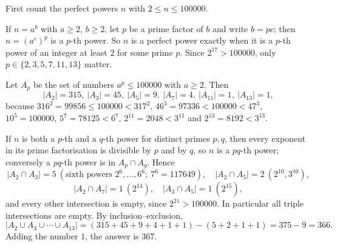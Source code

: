 First count the perfect powers $n$ with $2\le n\le100000$.

If $n=a^b$ with $a\ge2$, $b\ge2$, let $p$ be a prime factor of $b$ and write $b=pc$; then $n=\left(a^{c}\right)^p$ is a $p$-th power. So $n$ is a perfect power exactly when it is a $p$-th power of an integer at least $2$ for some prime $p$. Since $2^{17}>100000$, only $p\in\{2,3,5,7,11,13\}$ matter.

Let $A_p$ be the set of numbers $a^p\le100000$ with $a\ge2$. Then
\[|A_2|=315,\ |A_3|=45,\ |A_5|=9,\ |A_7|=4,\ |A_{11}|=1,\ |A_{13}|=1,\]
because $316^2=99856\le100000<317^2$, $46^3=97336<100000<47^3$, $10^5=100000$, $5^7=78125<6^7$, $2^{11}=2048<3^{11}$ and $2^{13}=8192<3^{13}$.

If $n$ is both a $p$-th and a $q$-th power for distinct primes $p,q$, then every exponent in its prime factorisation is divisible by $p$ and by $q$, so $n$ is a $pq$-th power; conversely a $pq$-th power is in $A_p\cap A_q$. Hence
\[|A_2\cap A_3|=5\ (\text{sixth powers }2^6,\dots,6^6;\ 7^6=117649),\quad |A_2\cap A_5|=2\ (2^{10},3^{10}),\]
\[|A_2\cap A_7|=1\ (2^{14}),\quad |A_3\cap A_5|=1\ (2^{15}),\]
and every other intersection is empty, since $2^{21}>100000$. In particular all triple intersections are empty. By inclusion--exclusion,
\[|A_2\cup A_3\cup\cdots\cup A_{13}|=(315+45+9+4+1+1)-(5+2+1+1)=375-9=366.\]
Adding the number $1$, the answer is $\boxed{367}$.
